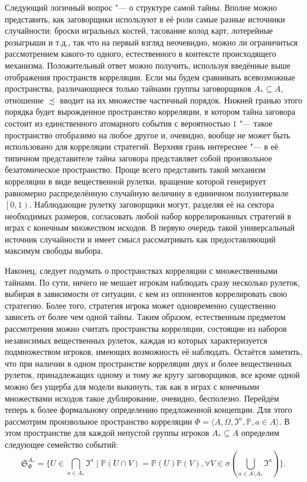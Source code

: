 Следующий логичный вопрос "--- о структуре самой тайны. Вполне можно представить, как заговорщики используют в её роли самые разные источники случайности: броски игральных костей, тасование колод карт, лотерейные розыгрыши и т.д., так что на первый взгляд неочевидно, можно ли ограничиться рассмотрением какого-то одного, естественного в контексте происходящего механизма. Положительный ответ можно получить, используя введённые выше отображения пространств корреляции. Если мы будем сравнивать всевозможные пространства, различающиеся только тайнами группы заговорщиков $A_* \subseteq A$, отношение $\precsim$ вводит на их множестве частичный порядок. Нижней гранью этого порядка будет вырожденное пространство корреляции, в котором тайна заговора состоит из единственного атомарного события с вероятностью $1$ "--- такое пространство отобразимо на любое другое и, очевидно, вообще не может быть использовано для корреляции стратегий. Верхняя грань интереснее "--- в её типичном представителе тайна заговора представляет собой произвольное безатомическое \cite[с.~81]{Bogachev} пространство. Проще всего представить такой механизм корреляции в виде вещественной рулетки, вращение которой генерирует равномерно распределённую случайную величину в единичном полуинтервале $\left[0, 1\right)$. Наблюдающие рулетку заговорщики могут, разделяя её на сектора необходимых размеров, согласовать любой набор коррелированных стратегий в играх с конечным множеством исходов. В первую очередь такой универсальный источник случайности и имеет смысл рассматривать как предоставляющий максимум свободы выбора.

Наконец, следует подумать о пространствах корреляции с множественными тайнами. По сути, ничего не мешает игрокам наблюдать сразу несколько рулеток, выбирая в зависимости от ситуации, с кем из оппонентов коррелировать свою стратегию. Более того, стратегия игрока может одновременно существенно зависеть от более чем одной тайны. Таким образом, естественным предметом рассмотрения можно считать пространства корреляции, состоящие из наборов независимых вещественных рулеток, каждая из которых характеризуется подмножеством игроков, имеющих возможность её наблюдать. Остаётся заметить, что при наличии в одном пространстве корреляции двух и более вещественных рулеток, принадлежащих одному и тому же кругу заговорщиков, все кроме одной можно без ущерба для модели выкинуть, так как в играх с конечными множествами исходов такое дублирование, очевидно, бесполезно. Перейдём теперь к более формальному определению предложенной концепции. Для этого рассмотрим произвольное пространство корреляции $\Phi = \langle A, \Omega, \mathfrak{I}^a, \mathbb{P}, a \in A \rangle$. В этом пространстве для каждой непустой группы игроков $A_* \subseteq A$ определим следующее семейство событий:
\begin{equation*}
	\mathfrak{S}_\Phi^{A_*} = \{U \in \bigcap\limits_{a \in A_*} \mathfrak{I}^a \mid \mathbb{P}(U \cap V) = \mathbb{P}(U) \mathbb{P}(V), \forall V \in \sigma(\bigcup\limits_{a \in A \setminus A_*} \mathfrak{I}^a)\}.
\end{equation*}

